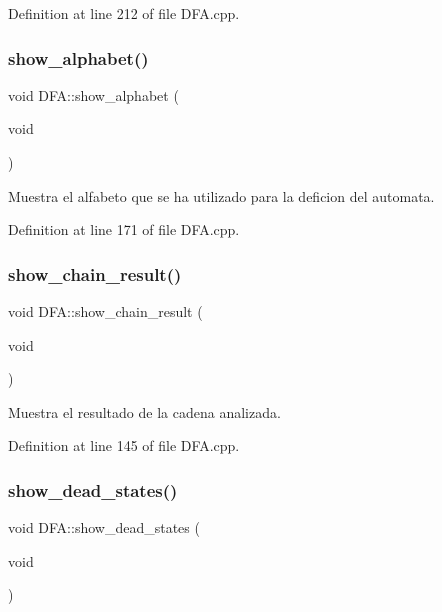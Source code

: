 Definition at line 212 of file D\+F\+A.\+cpp.

\mbox{\label{class_d_f_a_a3f03ba04e1130dafc0a62a101ecec61a}} 
\subsubsection{\texorpdfstring{show\+\_\+alphabet()}{show\_alphabet()}}
{\footnotesize\ttfamily void D\+F\+A\+::show\+\_\+alphabet (\begin{DoxyParamCaption}\item[{void}]{ }\end{DoxyParamCaption})}



Muestra el alfabeto que se ha utilizado para la deficion del automata. 



Definition at line 171 of file D\+F\+A.\+cpp.

\mbox{\label{class_d_f_a_a7b3b402a2383507bc7836a8fa8af9371}} 
\subsubsection{\texorpdfstring{show\+\_\+chain\+\_\+result()}{show\_chain\_result()}}
{\footnotesize\ttfamily void D\+F\+A\+::show\+\_\+chain\+\_\+result (\begin{DoxyParamCaption}\item[{void}]{ }\end{DoxyParamCaption})}



Muestra el resultado de la cadena analizada. 



Definition at line 145 of file D\+F\+A.\+cpp.

\mbox{\label{class_d_f_a_a311a5c043b5d11ea6ed4f34b8a901310}} 
\subsubsection{\texorpdfstring{show\+\_\+dead\+\_\+states()}{show\_dead\_states()}}
{\footnotesize\ttfamily void D\+F\+A\+::show\+\_\+dead\+\_\+states (\begin{DoxyParamCaption}\item[{void}]{ }\end{DoxyParamCaption})}



